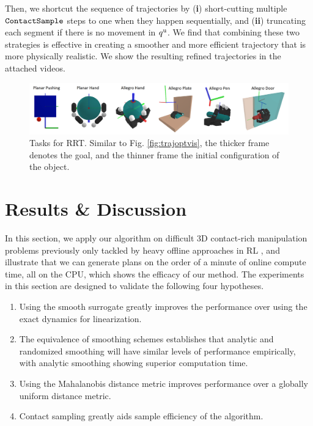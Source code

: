 Then, we shortcut the sequence of trajectories by (\textbf{i}) short-cutting multiple $\mathtt{ContactSample}$ steps to one when they happen sequentially, and (\textbf{ii}) truncating each segment if there is no movement in ${q^\mathrm{u}}$. We find that combining these two strategies is effective in creating a smoother and more efficient trajectory that is more physically realistic. We show the resulting refined trajectories in the attached videos.


\begin{figure}
\centering\includegraphics[width = 1.0\linewidth]{figures/03_contact_rich_planning/rrt_systems_pagewide.png}
\caption{Tasks for RRT. Similar to Fig. \ref{fig:trajoptvis}, the thicker frame denotes the goal, and the thinner frame the initial configuration of the object.}
\label{fig:rrt_tasks}
\end{figure}



\section{Results \& Discussion \label{sec:rrt_results}}
\noindent In this section, we apply our algorithm on difficult 3D contact-rich manipulation problems previously only tackled by heavy offline approaches in RL \cite{rajeswaran2018learning, chen2022system}, and illustrate that we can generate plans on the order of a minute of online compute time, all on the CPU, which shows the efficacy of our method.
The experiments in this section are designed to validate the following four hypotheses.
\begin{enumerate}
\item Using the smooth surrogate greatly improves the performance over using the exact dynamics for linearization.
\item The equivalence of smoothing schemes establishes that analytic and randomized smoothing will have similar levels of performance empirically, with analytic smoothing showing superior computation time.
\item Using the Mahalanobis distance metric improves performance over a globally uniform distance metric.
\item Contact sampling greatly aids sample efficiency of the algorithm.
\end{enumerate}

